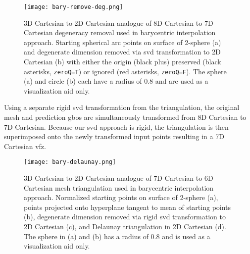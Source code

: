 \begin{figure}
    \centering
    \texttt{[image: bary-remove-deg.png]}
    \caption{3D Cartesian to 2D Cartesian analogue of 8D Cartesian to 7D Cartesian degeneracy removal used in barycentric interpolation approach. Starting spherical arc points on surface of 2-sphere (a) and degenerate dimension removed via \acrlong{svd} transformation to 2D Cartesian (b) with either the origin (black plus) preserved (black asterisks, \texttt{zeroQ=T}) or ignored (red asterisks, \texttt{zeroQ=F}). The sphere (a) and circle (b) each have a radius of 0.8 and are used as a visualization aid only.}
    \label{fig:bary-remove-deg}
\end{figure}

Using a separate rigid \gls{svd} transformation from the triangulation, the original mesh and prediction \glspl{gbo} are simultaneously transformed from 8D Cartesian to 7D Cartesian. Because our \gls{svd} approach is rigid, the triangulation is then superimposed onto the newly transformed input points resulting in a 7D Cartesian \gls{vfz}.

\begin{figure}
    \centering
    \texttt{[image: bary-delaunay.png]}
    \caption{3D Cartesian to 2D Cartesian analogue of 7D Cartesian to 6D Cartesian mesh triangulation used in barycentric interpolation approach. Normalized starting points on surface of 2-sphere (a), points projected onto hyperplane tangent to mean of starting points (b), degenerate dimension removed via rigid \gls{svd} transformation to 2D Cartesian (c), and Delaunay triangulation in 2D Cartesian (d). The sphere in (a) and (b) has a radius of 0.8 and is used as a visualization aid only.}
    \label{fig:bary-delaunay}
\end{figure}


